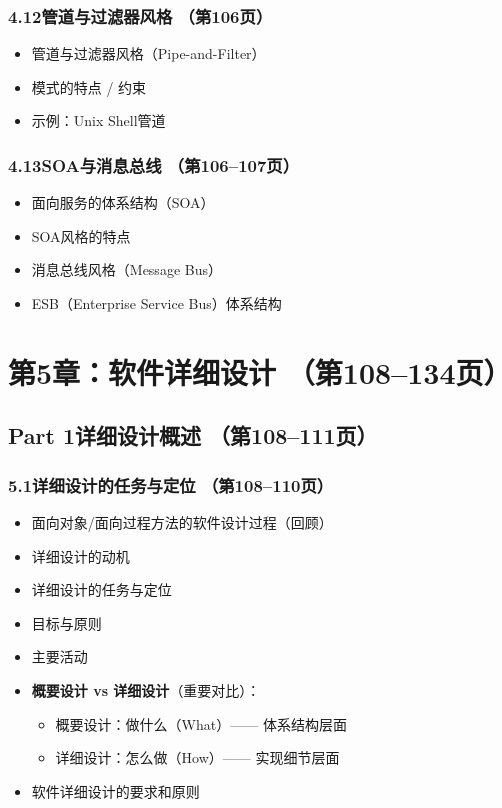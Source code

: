 \documentclass[12pt,a4paper]{ctexart}
\begin{document}
\subsubsection{4.12\quad 管道与过滤器风格 \hfill（第106页）}
\begin{itemize}
    \item 管道与过滤器风格（Pipe-and-Filter）
    \item 模式的特点 / 约束
    \item 示例：Unix Shell管道
\end{itemize}

\subsubsection{4.13\quad SOA与消息总线 \hfill（第106--107页）}
\begin{itemize}
    \item 面向服务的体系结构（SOA）
    \item SOA风格的特点
    \item 消息总线风格（Message Bus）
    \item ESB（Enterprise Service Bus）体系结构
\end{itemize}

\vspace{0.3cm}
\section{第5章：软件详细设计 \hfill（第108--134页）}

\subsection{Part 1\quad 详细设计概述 \hfill（第108--111页）}

\subsubsection{5.1\quad 详细设计的任务与定位 \hfill（第108--110页）}
\begin{itemize}
    \item 面向对象/面向过程方法的软件设计过程（回顾）
    \item 详细设计的动机
    \item 详细设计的任务与定位
    \item 目标与原则
    \item 主要活动
    \item \textbf{概要设计 vs 详细设计}（重要对比）：
    \begin{itemize}
        \item 概要设计：做什么（What）—— 体系结构层面
        \item 详细设计：怎么做（How）—— 实现细节层面
    \end{itemize}
    \item 软件详细设计的要求和原则
\end{itemize}
\end{document}
